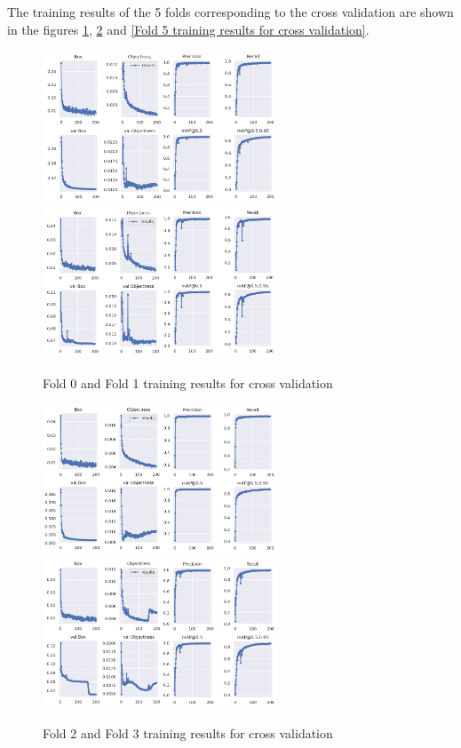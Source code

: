 The training results of the 5 folds corresponding to the cross validation are shown in the figures \ref{Fold 0 and Fold 1 training results for cross validation}, \ref{Fold 2 and Fold 3 training results for cross validation} and \ref{Fold 5 training results for cross validation}.
\begin{figure}[H]
    \centering
    {{\includegraphics[width=7cm]{images/training/cross/00.png} }}
    \qquad
  {{\includegraphics[width=7cm]{images/training/cross/01.png} }}
    \caption{Fold 0 and Fold 1 training results for cross validation}
    \label{Fold 0 and Fold 1 training results for cross validation}
\end{figure}

\begin{figure}[H]
    \centering
    {{\includegraphics[width=7cm]{images/training/cross/02.png} }}
    \qquad
  {{\includegraphics[width=7cm]{images/training/cross/03.png} }}
    \caption{Fold 2 and Fold 3 training results for cross validation}
    \label{Fold 2 and Fold 3 training results for cross validation}
\end{figure}

